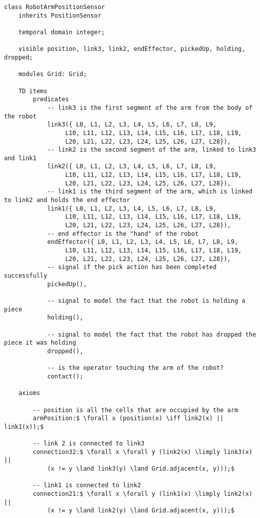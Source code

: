 \begin{lstlisting}[fontadjust, mathescape, frame=single] 
class RobotArmPositionSensor
    inherits PositionSensor

    temporal domain integer;

    visible position, link3, link2, endEffector, pickedUp, holding, dropped;

    modules Grid: Grid;

    TD items
        predicates
            -- link3 is the first segment of the arm from the body of the robot
            link3({ L0, L1, L2, L3, L4, L5, L6, L7, L8, L9,
                 L10, L11, L12, L13, L14, L15, L16, L17, L18, L19,
                 L20, L21, L22, L23, L24, L25, L26, L27, L28}),
            -- link2 is the second segment of the arm, linked to link3 and link1
            link2({ L0, L1, L2, L3, L4, L5, L6, L7, L8, L9,
                 L10, L11, L12, L13, L14, L15, L16, L17, L18, L19,
                 L20, L21, L22, L23, L24, L25, L26, L27, L28}),
            -- link1 is the third segment of the arm, which is linked to link2 and holds the end effector
            link1({ L0, L1, L2, L3, L4, L5, L6, L7, L8, L9,
                 L10, L11, L12, L13, L14, L15, L16, L17, L18, L19,
                 L20, L21, L22, L23, L24, L25, L26, L27, L28}),
            -- end effector is the "hand" of the robot
            endEffector({ L0, L1, L2, L3, L4, L5, L6, L7, L8, L9,
                 L10, L11, L12, L13, L14, L15, L16, L17, L18, L19,
                 L20, L21, L22, L23, L24, L25, L26, L27, L28}),
            -- signal if the pick action has been completed successfully
            pickedUp(),

            -- signal to model the fact that the robot is holding a piece
            holding(),

            -- signal to model the fact that the robot has dropped the piece it was holding
            dropped(),

            -- is the operator touching the arm of the robot?
            contact();

    axioms

        -- position is all the cells that are occupied by the arm
        armPosition:$ \forall x (position(x) \iff link2(x) || link1(x));$
        
        -- link 2 is connected to link3
        connection32:$ \forall x \forall y (link2(x) \limply link3(x) ||
            (x != y \land link3(y) \land Grid.adjacent(x, y)));$

        -- link1 is connected to link2
        connection21:$ \forall x \forall y (link1(x) \limply link2(x) ||
            (x != y \land link2(y) \land Grid.adjacent(x, y)));$


\end{lstlisting}
